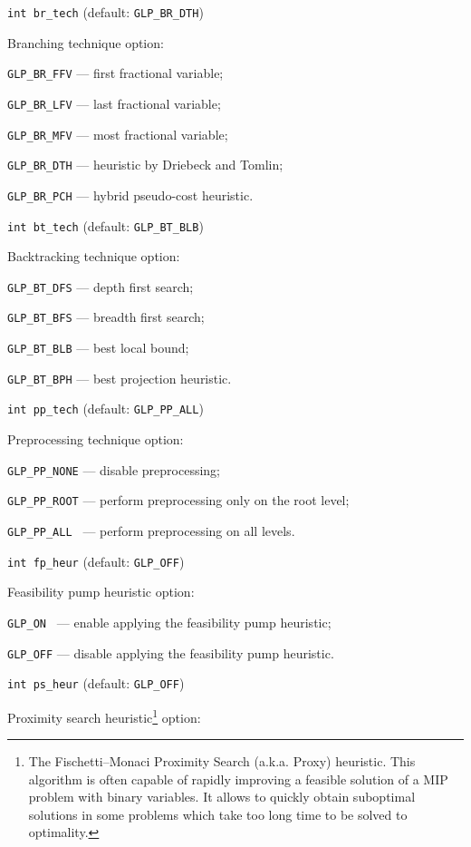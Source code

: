 {\tt int br\_tech} (default: {\tt GLP\_BR\_DTH})

Branching technique option:

\verb|GLP_BR_FFV| --- first fractional variable;

\verb|GLP_BR_LFV| --- last fractional variable;

\verb|GLP_BR_MFV| --- most fractional variable;

\verb|GLP_BR_DTH| --- heuristic by Driebeck and Tomlin;

\verb|GLP_BR_PCH| --- hybrid pseudo-cost heuristic.

\bigskip\vspace*{-2pt}

{\tt int bt\_tech} (default: {\tt GLP\_BT\_BLB})

Backtracking technique option:

\verb|GLP_BT_DFS| --- depth first search;

\verb|GLP_BT_BFS| --- breadth first search;

\verb|GLP_BT_BLB| --- best local bound;

\verb|GLP_BT_BPH| --- best projection heuristic.

\bigskip\vspace*{-2pt}

{\tt int pp\_tech} (default: {\tt GLP\_PP\_ALL})

Preprocessing technique option:

\verb|GLP_PP_NONE| --- disable preprocessing;

\verb|GLP_PP_ROOT| --- perform preprocessing only on the root level;

\verb|GLP_PP_ALL | --- perform preprocessing on all levels.

\bigskip\vspace*{-2pt}

{\tt int fp\_heur} (default: {\tt GLP\_OFF})

Feasibility pump heuristic option:

\verb|GLP_ON | --- enable applying the feasibility pump heuristic;

\verb|GLP_OFF| --- disable applying the feasibility pump heuristic.

\newpage

{\tt int ps\_heur} (default: {\tt GLP\_OFF})

Proximity search heuristic\footnote{The Fischetti--Monaci Proximity
Search (a.k.a. Proxy) heuristic. This algorithm is often capable of
rapidly improving a feasible solution of a MIP problem with binary
variables. It allows to quickly obtain suboptimal solutions in some
problems which take too long time to be solved to optimality.} option:

